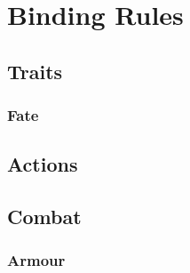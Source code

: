 \documentclass[a4paper,openany]{book}
\date{\today}
\begin{document}

\section*{Binding Rules}

\begin{multicols}{2}

\subsection*{Traits}





\subsubsection*{Fate}


\subsubsection*{}




\physicalSkillChart

\subsection*{Actions}








\subsection*{Combat}





\commonWeaponsChart

\subsubsection*{Armour}



\commonArmourChart


\end{multicols}
\end{document}
